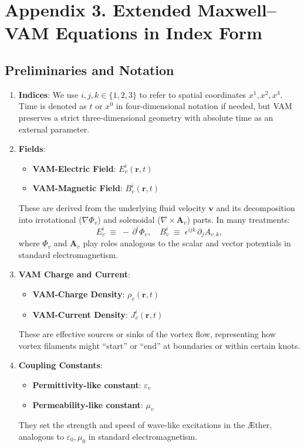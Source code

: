 
\section{Appendix 3. Extended Maxwell--VAM Equations in Index Form}

\subsection{Preliminaries and Notation}

\begin{enumerate}
    \item \textbf{Indices}: We use \(i, j, k \in \{1,2,3\}\) to refer to spatial coordinates \(x^1, x^2, x^3\). Time is denoted as \(t\) or \(x^0\) in four-dimensional notation if needed, but VAM preserves a strict three-dimensional geometry with absolute time as an external parameter.
    \item \textbf{Fields}:
    \begin{itemize}
        \item \textbf{VAM-Electric Field}: \(E_{v}^i(\mathbf{r}, t)\)
        \item \textbf{VAM-Magnetic Field}: \(B_{v}^i(\mathbf{r}, t)\)
    \end{itemize}
    These are derived from the underlying fluid velocity \(\mathbf{v}\) and its decomposition into irrotational (\(\nabla \Phi_v\)) and solenoidal (\(\nabla \times \mathbf{A}_v\)) parts. In many treatments:
    \[
        E_{v}^i \;\equiv\; -\,\partial^i \Phi_v,
        \quad
        B_{v}^i \;\equiv\; \epsilon^{ijk}\,\partial_j A_{v,k},
    \]
    where \(\Phi_v\) and \(\mathbf{A}_v\) play roles analogous to the scalar and vector potentials in standard electromagnetism.
    \item \textbf{VAM Charge and Current}:
    \begin{itemize}
        \item \textbf{VAM-Charge Density}: \(\rho_v(\mathbf{r}, t)\)
        \item \textbf{VAM-Current Density}: \(J_{v}^i(\mathbf{r}, t)\)
    \end{itemize}
    These are effective sources or sinks of the vortex flow, representing how vortex filaments might “start” or “end” at boundaries or within certain knots.
    \item \textbf{Coupling Constants}:
    \begin{itemize}
        \item \textbf{Permittivity-like constant}: \(\varepsilon_v\)
        \item \textbf{Permeability-like constant}: \(\mu_v\)
    \end{itemize}
    They set the strength and speed of wave-like excitations in the Æther, analogous to \(\varepsilon_0, \mu_0\) in standard electromagnetism.
\end{enumerate}

